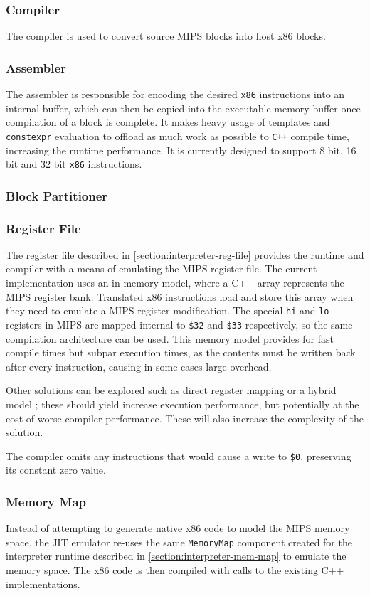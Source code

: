 \subsubsection{Compiler}

The compiler is used to convert source MIPS blocks into host x86 blocks.

\subsubsection{Assembler}

The assembler is responsible for encoding the desired \texttt{x86} instructions into an internal buffer, which can then be copied into the executable memory buffer once compilation of a block is complete. It makes heavy usage of templates and \texttt{constexpr} evaluation to offload as much work as possible to \texttt{C++} compile time, increasing the runtime performance. It is currently designed to support 8 bit, 16 bit and 32 bit \texttt{x86} instructions.

\subsubsection{Block Partitioner}


\subsubsection{Register File}

The register file described in \autoref{section:interpreter-reg-file} provides the runtime and compiler with a means of emulating the MIPS register file. The current implementation uses an in memory model, where a C++ array represents the MIPS register bank. Translated x86 instructions load and store this array when they need to emulate a MIPS register modification. The special \texttt{hi} and \texttt{lo} registers in MIPS are mapped internal to \texttt{\$32} and \texttt{\$33} respectively, so the same compilation architecture can be used. This memory model provides for fast compile times but subpar execution times, as the contents must be written back after every instruction, causing in some cases large overhead.

Other solutions can be explored such as direct register mapping or a hybrid model \cite{mark-probst-dbt}; these should yield increase execution performance, but potentially at the cost of worse compiler performance. These will also increase the complexity of the solution.

The compiler omits any instructions that would cause a write to \texttt{\$0}, preserving its constant zero value.

\subsubsection{Memory Map}

Instead of attempting to generate native x86 code to model the MIPS memory space, the JIT emulator re-uses the same \texttt{MemoryMap} component created for the interpreter runtime described in \autoref{section:interpreter-mem-map} to emulate the memory space. The x86 code is then compiled with calls to the existing C++ implementations.
